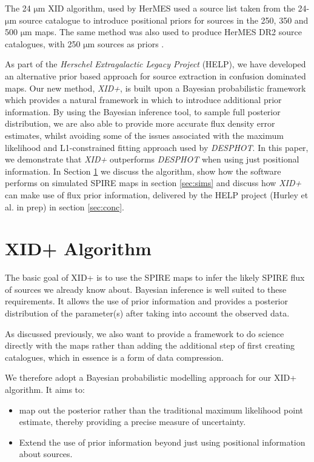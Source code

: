 \documentclass[useAMS,usenatbib]{mnras}
\begin{document}
The 24 $\mathrm{\mu m}$ XID algorithm, used by HerMES \citep{Roseboom:2010, Roseboom:2011} used a source list taken from the 24-$\mathrm{\mu m}$ source catalogue to introduce positional priors for sources in the 250, 350 and 500 $\mathrm{\mu m}$ maps. The same method was also used to produce HerMES DR2 source catalogues, with 250 $\mathrm{\mu m}$ sources as priors \citep[DESPHOT]{Wang:2014}. 

As part of the \emph{Herschel Extragalactic Legacy Project} (HELP), we have developed an alternative prior based approach for source extraction in confusion dominated maps. Our new method, \emph{XID+}, is built upon a Bayesian probabilistic framework which provides a natural framework in which to introduce additional prior information. By using the Bayesian inference tool, \citep[\emph{Stan},][]{stan-software:2015,pystan-software:2015} to sample full posterior distribution, we are also able to provide more accurate flux density error estimates, whilst avoiding some of the issues associated with the maximum likelihood and L1-constrained fitting approach used by \emph{DESPHOT}. In this paper, we demonstrate that \emph{XID+} outperforms \emph{DESPHOT} when using just positional information. In Section \ref{sec:XID+} we discuss the algorithm, show how the software performs on simulated SPIRE maps in section \ref{sec:sims} and discuss how \emph{XID+} can make use of flux prior information, delivered by the HELP project (Hurley et al. in prep) in section \ref{sec:conc}.
 
\section{XID+ Algorithm}\label{sec:XID+}
The basic goal of XID+ is to use the SPIRE maps to infer the likely SPIRE flux of sources we already know about. Bayesian inference is well suited to these requirements. It allows the use of prior information and provides a posterior distribution of the parameter(s) after taking into account the observed data.  

As discussed previously, we also want to provide a framework to do science directly with the maps rather than adding the additional step of first creating catalogues, which in essence is a form of data compression.

We therefore adopt a Bayesian probabilistic modelling approach for our XID+ algorithm. It aims to:
\begin{itemize}
\item map out the posterior rather than the traditional maximum likelihood point estimate, thereby providing a precise measure of uncertainty. 
\item Extend the use of prior information beyond just using positional information about sources.
\end{itemize}
\end{document}
